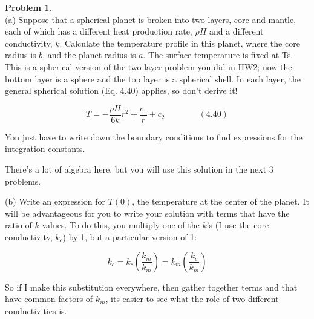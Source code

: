 \documentclass[titlepage, 11pt]{article}
\theoremstyle{definition}
\newtheorem{problem}{Problem}
\begin{document}
\begin{problem}\ \\
(a) Suppose that a spherical planet is broken into two layers, core and mantle, each of which has a different heat production rate, $\rho H$ and a different conductivity, $k$. Calculate the temperature profile in this planet, where the core radius is $b$, and the planet radius is $a$. The surface temperature is fixed at Ts. This is a spherical version of the two-layer problem you did in HW2; now the bottom layer is a sphere and the top layer is a spherical shell. In each layer, the general spherical solution (Eq. 4.40) applies, so don’t derive it!

$$T = - \frac{\rho H}{6k}{r}^{2} + \frac{c_1}{r} + c_{2} \qquad \qquad (4.40)$$

\noindent
You just have to write down the boundary conditions to find expressions for the integration constants.\vspace{\baselineskip}

\noindent
There’s a lot of algebra here, but you will use this solution in the next 3 problems.\vspace{\baselineskip}

\noindent
(b) Write an expression for $T(0)$, the temperature at the center of the planet. It will be advantageous for you to write your solution with terms that have the ratio of $k$ values. To do this, you multiply one of the $k$’s (I use the core conductivity, $k_c$) by 1, but a particular version of 1:

$$k_{c} = k_{c} \left(\frac{k_{m}}{k_{m}}\right) = k_{m}\left(\frac{k_{c}}{k_{m}}\right)$$

\noindent
So if I make this substitution everywhere, then gather together terms and that have common factors of $k_{m}$, its easier to see what the role of two different conductivities is. 
\end{problem}
\end{document}
